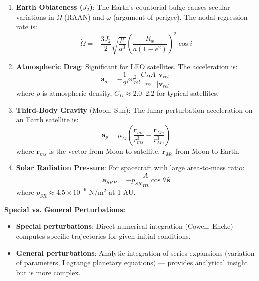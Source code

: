 \documentclass[11pt]{article}
\begin{document}
\begin{enumerate}
\item \textbf{Earth Oblateness ($J_2$)}: The Earth's equatorial bulge causes secular variations in $\Omega$ (RAAN) and $\omega$ (argument of perigee). The nodal regression rate is:
\begin{equation}
\dot{\Omega} = -\frac{3J_2}{2}\sqrt{\frac{\mu}{a^3}}\left(\frac{R_\oplus}{a(1-e^2)}\right)^2\cos i
\end{equation}

\item \textbf{Atmospheric Drag}: Significant for LEO satellites. The acceleration is:
\begin{equation}
\mathbf{a}_d = -\frac{1}{2}\rho v_{rel}^2 \frac{C_D A}{m}\frac{\mathbf{v}_{rel}}{|\mathbf{v}_{rel}|}
\end{equation}
where $\rho$ is atmospheric density, $C_D \approx 2.0$--$2.2$ for typical satellites.

\item \textbf{Third-Body Gravity} (Moon, Sun): The lunar perturbation acceleration on an Earth satellite is:
\begin{equation}
\mathbf{a}_p = \mu_M\left(\frac{\mathbf{r}_{ms}}{r_{ms}^3} - \frac{\mathbf{r}_{Me}}{r_{Me}^3}\right)
\end{equation}
where $\mathbf{r}_{ms}$ is the vector from Moon to satellite, $\mathbf{r}_{Me}$ from Moon to Earth.

\item \textbf{Solar Radiation Pressure}: For spacecraft with large area-to-mass ratio:
\begin{equation}
\mathbf{a}_{SRP} = -p_{SR}\frac{A}{m}\cos\theta\,\mathbf{\hat{s}}
\end{equation}
where $p_{SR} \approx 4.5 \times 10^{-6}$ N/m$^2$ at 1 AU.
\end{enumerate}

\textbf{Special vs. General Perturbations:}
\begin{itemize}
\item \textbf{Special perturbations}: Direct numerical integration (Cowell, Encke) --- computes specific trajectories for given initial conditions.
\item \textbf{General perturbations}: Analytic integration of series expansions (variation of parameters, Lagrange planetary equations) --- provides analytical insight but is more complex.
\end{itemize}

\end{document}
